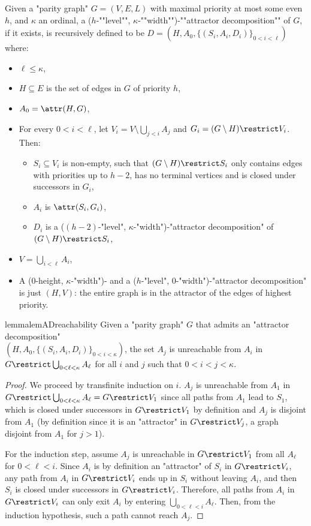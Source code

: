 \documentclass[a4paper,UKenglish,cleveref, autoref, thm-restate]{lipics-v2021}
\renewcommand{\leq}{\leqslant}
\begin{document}
\AP Given a "parity graph" $G=(V,E,L)$ with maximal priority at most some even $h$, and $\kappa$ an ordinal, a ($h$-""level"", $\kappa$-""width"")-""attractor decomposition"" of $G$, if it exists, is recursively defined to be $D=(H,A_0,\{(S_i,A_i,D_i)\}_{0<i<\ell})$ where:
\begin{itemize}
	\item $\ell\leq \kappa$,
	\item $H\subseteq E$ is the set of edges in $G$ of priority $h$,
	\item $A_0= \attr(H,G)$,
	\item For every $0<i<\ell$, let $V_i=V\setminus \bigcup_{j< i}A_j$ and $G_i=(G\setminus H)\restrict V_i$. Then:
	\begin{itemize}
		\item $S_i\subseteq V_i$  is non-empty, such that $(G\setminus H)\restrict S_i$ only contains edges with priorities up to $h{-}2$, has no terminal vertices and is closed under successors in $G_i$,
		\item $A_i$ is  $\attr(S_i,G_i)$,
		\item $D_i$ is a ($(h{-}2)$-"level", $\kappa$-"width")-"attractor decomposition" of $(G\setminus H) \restrict S_i$,
	\end{itemize}
	\item $V=\bigcup_{i<\ell} A_i$,
	\item A ($0$-height, $\kappa$-"width")- and a ($h$-"level", $0$-"width")-"attractor decomposition" is just $(H,V)$: the entire graph is in the attractor of the edges of highest priority.
\end{itemize}


\begin{restatable}{lemma}{lemADreachability}\label{cl:ADreachability}	
	Given a "parity graph" $G$ that admits an "attractor decomposition"\\
	$(H, A_0,\{(S_i,A_i,D_i)\}_{0<i < \kappa})$, the set $A_j$ is unreachable from $A_i$ in $G\restrict \bigcup_{0<\ell < \kappa} A_{\ell}$ for all $i$ and $j$ such that $0<i<j < \kappa$.
\end{restatable}

\begin{proof}
	We proceed by transfinite induction on $i$. $A_j$ is unreachable from $A_1$ in $G\restrict \bigcup_{0<\ell<\kappa} A_{\ell}=G\restrict V_1$ since all paths from $A_1$ lead to $S_1$, which is closed under successors in $G\restrict V_1$ by definition and $A_j$ is disjoint from $A_1$ (by definition since it is an "attractor" in $G\restrict V_j$, a graph disjoint from $A_1$ for $j>1$).
	
	
	For the induction step, assume $A_j$ is unreachable in $G\restrict V_1$ from all $A_{\ell}$ for $0<\ell< i$. Since $A_i$ is by definition an "attractor" of $S_i$ in $G\restrict V_i$, any path from $A_i$ in $G\restrict V_i$ ends up in $S_i$ without leaving $A_i$, and then $S_i$ is closed under successors in $G\restrict V_i$. Therefore, all paths from $A_i$ in $G\restrict V_i$ can only exit $A_i$ by entering $\bigcup_{0<\ell<i}A_{\ell}$. Then, from the induction hypothesis, such a path cannot reach $A_j$.\qedhere
	
\end{proof}
\end{document}
